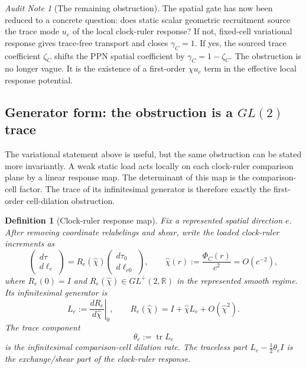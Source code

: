 \documentclass[11pt]{article}
\newtheorem{definition}[theorem]{Definition}
\theoremstyle{remark}
\newtheorem{audit}[theorem]{Audit Note}
\begin{document}
\begin{audit}[The remaining obstruction]
The spatial gate has now been reduced to a concrete question: does static scalar geometric recruitment source the trace mode \(u_e\) of the local clock-ruler response?  If not, fixed-cell variational response gives trace-free transport and closes \(\gamma_C=1\).  If yes, the sourced trace coefficient \(\zeta_C\) shifts the PPN spatial coefficient by \(\gamma_C=1-\zeta_C\).  The obstruction is no longer vague.  It is the existence of a first-order \(\chi u_e\) term in the effective local response potential.
\end{audit}


\subsection{Generator form: the obstruction is a \texorpdfstring{$GL(2)$}{GL(2)} trace}

The variational statement above is useful, but the same obstruction can be stated more invariantly.  A weak static load acts locally on each clock-ruler comparison plane by a linear response map.  The determinant of this map is the comparison-cell factor.  The trace of its infinitesimal generator is therefore exactly the first-order cell-dilation obstruction.

\begin{definition}[Clock-ruler response map]
\label{def:clock-ruler-response-map}
Fix a represented spatial direction \(e\).  After removing coordinate relabelings and shear, write the loaded clock-ruler increments as
\[
        \begin{pmatrix} d\tau \\ d\ell_e \end{pmatrix}
        =R_e(\hat\chi)
        \begin{pmatrix} d\tau_0 \\ d\ell_{e0} \end{pmatrix},
        \qquad
        \hat\chi(r):=\frac{\Phi_C(r)}{c^2}=O(c^{-2}),
\]
where \(R_e(0)=I\) and \(R_e(\hat\chi)\in GL^+(2,\mathbb R)\) in the represented smooth regime.  Its infinitesimal generator is
\[
        L_e:=\left.\frac{dR_e}{d\hat\chi}\right|_{0},
        \qquad
        R_e(\hat\chi)=I+\hat\chi L_e+O(\hat\chi^2).
\]
The trace component
\[
        \theta_e:=\operatorname{tr}L_e
\]
is the infinitesimal comparison-cell dilation rate.  The traceless part \(L_e-\frac12\theta_e I\) is the exchange/shear part of the clock-ruler response.
\end{definition}
\end{document}
